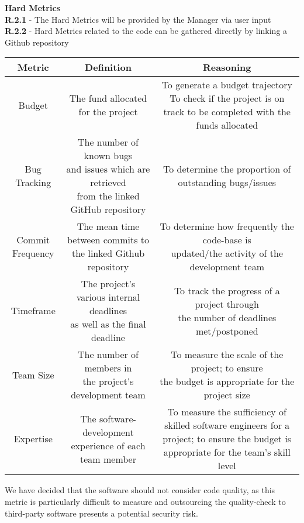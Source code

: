 \documentclass[a4paper]{article}
\theoremstyle{plain}
\theoremstyle{definition}
\theoremstyle{remark}
\begin{document}
\noindent\textbf{Hard Metrics} \\

\indent \textbf{R.2.1} - The Hard Metrics will be provided by the Manager via user input\\
\indent \textbf{R.2.2} - Hard Metrics related to the code can be gathered directly by linking a Github repository
\begin{table}[H]
\begin{adjustwidth}{-.5in}{-.5in}
	\centering
	\label{tab:label}
	\begin{tabular}{|c|c|c|}
		\hline
	\textbf{Metric}& \textbf{Definition} & \textbf{Reasoning}\\
	\hline
	Budget & The fund allocated for the project & \makecell{To generate a budget trajectory \\ To check if the project is on track to be completed with the funds allocated} \\
\hline
	Bug Tracking & \makecell{The number of known bugs \\ and issues  which are retrieved \\ from the linked GitHub repository} & To determine the proportion of outstanding bugs/issues \\
	\hline
	\makecell{Commit \\ Frequency} & \makecell{The mean time between commits to \\ the linked Github  repository} & \makecell{To determine how frequently the code-base is \\ updated/the activity of the development team} \\
	\hline
	Timeframe & \makecell{The project’s various internal deadlines \\as well as the final deadline} & \makecell{To track the progress of a project through \\ the number of deadlines met/postponed} \\
	\hline
	Team Size & \makecell{The number of members in \\ the project's development team} & \makecell{To measure the scale of the project; to ensure \\ the budget is appropriate for the project size}\\
	\hline
	Expertise & \makecell{The software-development \\ experience of each team member} & \makecell{ To measure the sufficiency of skilled software engineers for a \\ project; to ensure the budget is appropriate for the team’s skill level }\\
	\hline
	\end{tabular}
\end{adjustwidth}
\end{table}
\noindent We have decided that the software should not consider code quality, as this metric is particularly difficult to measure and outsourcing the quality-check to third-party software presents a potential security risk. \\\
\end{document}
